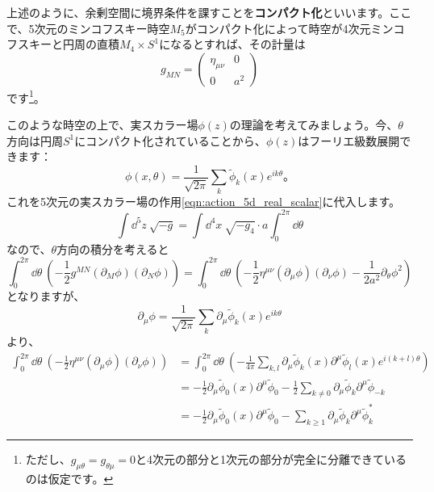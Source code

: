\documentclass[unicode,a4paper,10pt]{ltjsarticle}
\begin{document}
上述のように、余剰空間に境界条件を課すことを\textbf{コンパクト化}といいます。ここで、5次元のミンコフスキー時空$M_{5}$がコンパクト化によって時空が4次元ミンコフスキーと円周の直積$M_{4}\times S^{1}$になるとすれば、その計量は
\begin{equation}
   g_{MN}
   =
   \begin{pmatrix}
      \eta_{\mu\nu} & 0 \\
      0 & a^2
   \end{pmatrix}
\end{equation}
です\footnote{
   ただし、$g_{\mu\theta}=g_{\theta\mu}=0$と4次元の部分と1次元の部分が完全に分離できているのは仮定です。
}。

このような時空の上で、実スカラー場$\phi(z)$の理論を考えてみましょう。今、$\theta$方向は円周$S^{1}$にコンパクト化されていることから、$\phi(z)$はフーリエ級数展開できます：
\begin{equation}
   \phi(x,\theta)
   =
   \frac{1}{\sqrt{2\pi}}
   \sum_{k}\tilde{\phi}_{k}(x)e^{ik\theta}
   \text{。}
\end{equation}
これを5次元の実スカラー場の作用\eqref{eqn:action_5d_real_scalar}に代入します。
\begin{equation}
   \int\dd^5 z\ 
   \sqrt{-g}
   =
   \int\dd^4 x\ \sqrt{-g_{4}}
   \cdot
   a\int_{0}^{2\pi}\dd \theta
\end{equation}
なので、$\theta$方向の積分を考えると
\begin{equation}
   \int_{0}^{2\pi}\dd \theta\ 
   \left(  
      -\frac{1}{2}g^{MN}(\partial_{M}\phi)(\partial_{N}\phi)
   \right)
   =
   \int_{0}^{2\pi}\dd \theta\ 
   \left(  
      -
      \frac{1}{2}\eta^{\mu\nu}(\partial_{\mu}\phi)(\partial_{\nu}\phi)
      -
      \frac{1}{2a^2}\partial_{\theta}\phi^2
   \right)   
   \label{eqn:2_1}
\end{equation}
となりますが、
\begin{equation}
   \partial_{\mu}\phi
   =
   \frac{1}{\sqrt{2\pi}}
   \sum_{k}\partial_{\mu}\tilde{\phi}_{k}(x)e^{ik\theta}
\end{equation}
より、
\begin{align}
   \int_{0}^{2\pi}\dd \theta\ 
   \left(  
      -
      \frac{1}{2}\eta^{\mu\nu}(\partial_{\mu}\phi)(\partial_{\nu}\phi)
   \right)   
   &=
   \int_{0}^{2\pi}\dd \theta\ 
   \left(  
      -\frac{1}{4\pi}\sum_{k,l}\partial_{\mu}\tilde{\phi}_{k}(x)\partial^{\mu}\tilde{\phi}_{l}(x)e^{i(k+l)\theta}
   \right)
   \nonumber
   \\
   &=
   -\frac{1}{2}\partial_{\mu}\tilde{\phi}_{0}(x)\partial^{\mu}\tilde{\phi}_{0}
   -\frac{1}{2}\sum_{k\neq 0}\partial_{\mu}\tilde{\phi}_{k}\partial^{\mu}\tilde{\phi}_{-k}
   \nonumber
   \\
   &=
   -\frac{1}{2}\partial_{\mu}\tilde{\phi}_{0}(x)\partial^{\mu}\tilde{\phi}_{0}
   -\sum_{k\geq 1}\partial_{\mu}\tilde{\phi}_{k}\partial^{\mu}\tilde{\phi}_{k}^{\ast}
\end{align}
\end{document}
